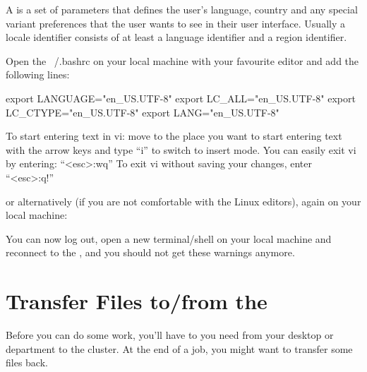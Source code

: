 A  is a set of parameters that defines the user's language,
country and any special variant preferences that the user wants to see in their
user interface. Usually a locale identifier consists of at least a language
identifier and a region identifier.

\ifmacORlinux
Open the  ~/.bashrc on your local machine with your
favourite editor and add the following lines:

\begin{prompt}
export LANGUAGE="en_US.UTF-8"
export LC_ALL="en_US.UTF-8"
export LC_CTYPE="en_US.UTF-8"
export LANG="en_US.UTF-8"
\end{prompt}

\begin{tip}[vi]
To start entering text in vi: move to the place you want to start entering text
with the arrow keys and type ``i'' to switch to insert mode.  You can easily
exit vi by entering: ``<esc>:wq''
To exit vi without saving your changes, enter ``<esc>:q!''
\end{tip}

or alternatively (if you are not comfortable with the Linux editors), again on your local machine:

\begin{prompt}
\end{prompt}

You can now log out, open a new terminal/shell on your local machine and reconnect to the \hpc, and you should not get these
warnings anymore.

\fi
\section{Transfer Files to/from the \hpc}
\hypertarget{sec:filetransfer}{}


Before you can do some work, you'll have to 
you need from your desktop or department to the cluster. At the end of a job,
you might want to transfer some files back.

